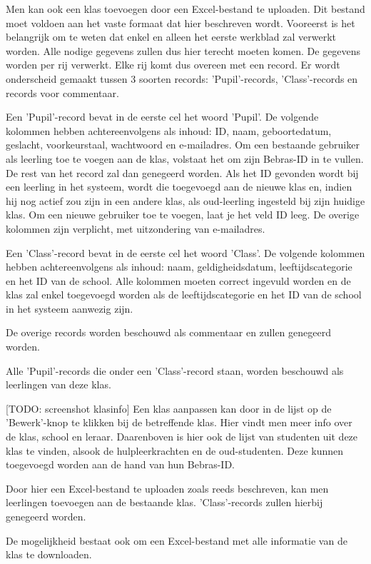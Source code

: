 \documentclass[]{article}
\begin{document}
Men kan ook een klas toevoegen door een Excel-bestand te uploaden. Dit bestand moet voldoen aan het vaste formaat dat hier beschreven wordt. 
Vooreerst is het belangrijk om te weten dat enkel en alleen het eerste werkblad zal verwerkt worden. Alle nodige gegevens zullen dus hier terecht moeten komen. De gegevens worden per rij verwerkt. Elke rij komt dus overeen met een record. Er wordt onderscheid gemaakt tussen 3 soorten records: 'Pupil'-records, 'Class'-records en records voor commentaar.

Een 'Pupil'-record bevat in de eerste cel het woord 'Pupil'. De volgende kolommen hebben achtereenvolgens als inhoud: ID, naam, geboortedatum, geslacht, voorkeurstaal, wachtwoord en e-mailadres. Om een bestaande gebruiker als leerling toe te voegen aan de klas, volstaat het om zijn Bebras-ID in te vullen. De rest van het record zal dan genegeerd worden. Als het ID gevonden wordt bij een leerling in het systeem, wordt die toegevoegd aan de nieuwe klas en, indien hij nog actief zou zijn in een andere klas, als oud-leerling ingesteld bij zijn huidige klas.  
Om een nieuwe gebruiker toe te voegen, laat je het veld ID leeg. De overige kolommen zijn verplicht, met uitzondering van e-mailadres.

Een 'Class'-record bevat in de eerste cel het woord 'Class'. De volgende kolommen hebben achtereenvolgens als inhoud: naam, geldigheidsdatum, leeftijdscategorie en het ID van de school. Alle kolommen moeten correct ingevuld worden en de klas zal enkel toegevoegd worden als de leeftijdscategorie en het ID van de school in het systeem aanwezig zijn. 

De overige records worden beschouwd als commentaar en zullen genegeerd worden.

Alle 'Pupil'-records die onder een 'Class'-record staan, worden beschouwd als leerlingen van deze klas. 

[TODO: screenshot klasinfo]
Een klas aanpassen kan door in de lijst op de 'Bewerk'-knop te klikken bij de betreffende klas. Hier vindt men meer info over de klas, school en leraar. Daarenboven is hier ook de lijst van studenten uit deze klas te vinden, alsook de hulpleerkrachten en de oud-studenten. Deze kunnen toegevoegd worden aan de hand van hun Bebras-ID.

Door hier een Excel-bestand te uploaden zoals reeds beschreven, kan men leerlingen toevoegen aan de bestaande klas. 'Class'-records zullen hierbij genegeerd worden.

De mogelijkheid bestaat ook om een Excel-bestand met alle informatie van de klas te downloaden.
\end{document}
